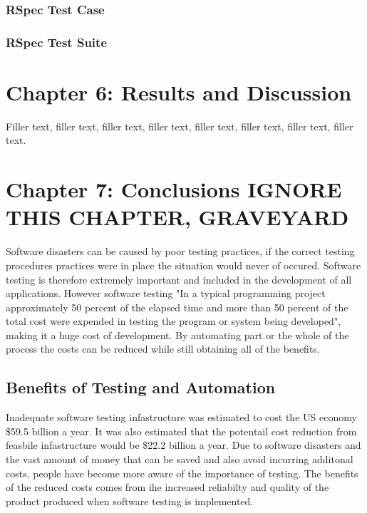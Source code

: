 \documentclass[a4paper,12pt]{article}
\begin{document}
\subsubsection{RSpec Test Case}


\subsubsection{RSpec Test Suite}



\section{Chapter 6: Results and Discussion}
Filler text, filler text, filler text, filler text, filler text, filler text, filler text, filler text.
\section{Chapter 7: Conclusions IGNORE THIS CHAPTER, GRAVEYARD}

\par Software disasters can be caused by poor testing practices,\cite{mcquaid2012software} if the correct testing procedures practices were in place the situation would never of occured. Software testing is therefore extremely important and included in the development of all applications. However software testing "In a typical programming project approximately 50 percent of the elapsed time and more than 50 percent of the total cost were expended in testing the program or system being developed"\cite{myers2011art}, making it a huge cost of development. By automating part or the whole of the process the costs can be reduced while still obtaining all of the benefits.

\subsection{Benefits of Testing and Automation}

\par Inadequate software testing infastructure was estimated to cost the US economy \$59.5 billion a year.\cite{NISTReport} It was also estimated that the potentail cost reduction from feasbile infastructure would be \$22.2 billion a year. \cite{NISTReport} Due to software disasters and the vast amount of money that can be saved and also avoid incurring additonal costs, people have become more aware of the importance of testing. The benefits of the reduced costs  comes from ihe increased reliabilty and quality of the product produced when software testing is implemented.
\end{document}
